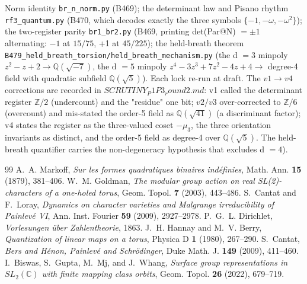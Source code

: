 \documentclass[11pt]{article}
\theoremstyle{plain}
\theoremstyle{definition}
\theoremstyle{remark}
\begin{document}
Norm identity \texttt{br\_n\_norm.py} (B469); the determinant law and Pisano rhythm \texttt{rf3\_quantum.py} (B470, which decodes exactly the three symbols \(\{-1, -\omega , -\omega ^{2}\}\)); the two-register parity \texttt{br1\_br2.py} (B469, printing det(Par@N) \(= \pm 1\) alternating: \(-1\) at \(15/75\), +1 at \(45/225\)); the held-breath theorem \texttt{B479\_held\_breath\_torsion/held\_breath\_mechanism.py} (the d \(= 3\) minpoly \(z^{2}-z+2 \to  \mathbb{Q}(\sqrt{-7})\), the d \(= 5\) minpoly \(z^{4}-3z^{3}+7z^{2}-4z+4 \to \) degree-4 field with quadratic subfield \(\mathbb{Q}(\sqrt{5})\)). Each lock re-run at draft. The \(v1\to v4\) corrections are recorded in \(SCRUTINY_{P}1P3_{r}ound2.md\): v1 called the determinant register \(\mathbb{Z}/2\) (undercount) and the "residue" one bit; \(v2/v3\) over-corrected to \(\mathbb{Z}/6\) (overcount) and mis-stated the order-5 field as \(\mathbb{Q}(\sqrt{41})\) (a discriminant factor); v4 states the register as the three-valued coset \(-\mu _{3}\), the three orientation invariants as distinct, and the order-5 field as degree-4 over \(\mathbb{Q}(\sqrt{5})\). The held-breath quantifier carries the non-degeneracy hypothesis that excludes d \(= 4\)).

\begin{thebibliography}{99}
 A.~A. Markoff, \emph{Sur les formes quadratiques binaires ind\'efinies}, Math. Ann. \textbf{15} (1879), 381--406.
 W.~M. Goldman, \emph{The modular group action on real SL(2)-characters of a one-holed torus}, Geom. Topol. \textbf{7} (2003), 443--486.
 S.~Cantat and F.~Loray, \emph{Dynamics on character varieties and Malgrange irreducibility of Painlev\'e VI}, Ann. Inst. Fourier \textbf{59} (2009), 2927--2978.
 P.~G.~L. Dirichlet, \emph{Vorlesungen \"uber Zahlentheorie}, 1863.
 J.~H. Hannay and M.~V. Berry, \emph{Quantization of linear maps on a torus}, Physica D \textbf{1} (1980), 267--290.
 S.~Cantat, \emph{Bers and H\'enon, Painlev\'e and Schr\"odinger}, Duke Math. J. \textbf{149} (2009), 411--460.
 I.~Biswas, S.~Gupta, M.~Mj, and J.~Whang, \emph{Surface group representations in $SL_2(\mathbb{C})$ with finite mapping class orbits}, Geom. Topol. \textbf{26} (2022), 679--719.
\end{thebibliography}
\end{document}
